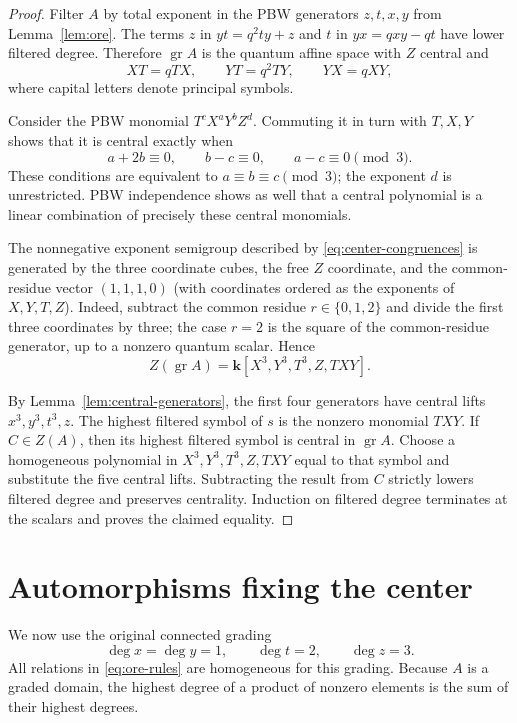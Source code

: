 \documentclass[11pt]{article}
\newcommand{\gr}{\operatorname{gr}}
\newcommand{\kk}{\mathbf{k}}
\begin{document}
\begin{proof}
Filter $A$ by total exponent in the PBW generators $z,t,x,y$ from
Lemma~\ref{lem:ore}.  The terms $z$ in $yt=q^2ty+z$ and $t$ in
$yx=qxy-qt$ have lower filtered degree.  Therefore $\gr A$ is the quantum
affine space with $Z$ central and
\begin{equation}
 XT=qTX,
 \qquad YT=q^2TY,
 \qquad YX=qXY,
 \label{eq:gr-relations}
\end{equation}
where capital letters denote principal symbols.

Consider the PBW monomial $T^cX^aY^bZ^d$.  Commuting it in turn with
$T,X,Y$ shows that it is central exactly when
\begin{equation}
 a+2b\equiv0,\qquad b-c\equiv0,\qquad a-c\equiv0
 \pmod 3.
 \label{eq:center-congruences}
\end{equation}
These conditions are equivalent to $a\equiv b\equiv c\pmod3$; the exponent
$d$ is unrestricted.  PBW independence shows as well that a central
polynomial is a linear combination of precisely these central monomials.

The nonnegative exponent semigroup described by
\eqref{eq:center-congruences} is generated by the three coordinate cubes,
the free $Z$ coordinate, and the common-residue vector $(1,1,1,0)$ (with
coordinates ordered as the exponents of $X,Y,T,Z$).  Indeed, subtract the
common residue $r\in\{0,1,2\}$ and divide the first three coordinates by
three; the case $r=2$ is the square of the common-residue generator, up to a
nonzero quantum scalar.  Hence
\[
 Z(\gr A)=\kk[X^3,Y^3,T^3,Z,TXY].
\]

By Lemma~\ref{lem:central-generators}, the first four generators have
central lifts $x^3,y^3,t^3,z$.  The highest filtered symbol of $s$ is the
nonzero monomial $TXY$.  If $C\in Z(A)$, then its highest filtered symbol is
central in $\gr A$.  Choose a homogeneous polynomial in
$X^3,Y^3,T^3,Z,TXY$ equal to that symbol and substitute the five central
lifts.  Subtracting the result from $C$ strictly lowers filtered degree and
preserves centrality.  Induction on filtered degree terminates at the
scalars and proves the claimed equality.
\end{proof}

\section{Automorphisms fixing the center}

We now use the original connected grading
\[
 \deg x=\deg y=1,\qquad \deg t=2,\qquad \deg z=3.
\]
All relations in \eqref{eq:ore-rules} are homogeneous for this grading.
Because $A$ is a graded domain, the highest degree of a product of nonzero
elements is the sum of their highest degrees.
\end{document}
